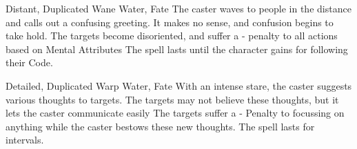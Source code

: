 \ifodd\value{diceNo}

  {Distant, Duplicated}%
  {Wane}%
  {Water, Fate}%
  {}%
  {
    The caster waves to people in the distance and calls out a confusing greeting.
    It makes no sense, and confusion begins to take hold.
    The targets become disoriented, and suffer a - penalty to all actions based on Mental Attributes}%
  {
    The spell lasts until the character gains  for following their Code.
  }

\else

  {Detailed, Duplicated}%
  {Warp}%
  {Water, Fate}%
  {}%
  {With an intense stare, the caster suggests various thoughts to  targets.
  The targets may not believe these thoughts, but it lets the caster communicate easily}%
  {The targets suffer a - Penalty to focussing on anything while the caster bestows these new thoughts.
  The spell lasts for  \glspl{interval}.}

\fi
{}
